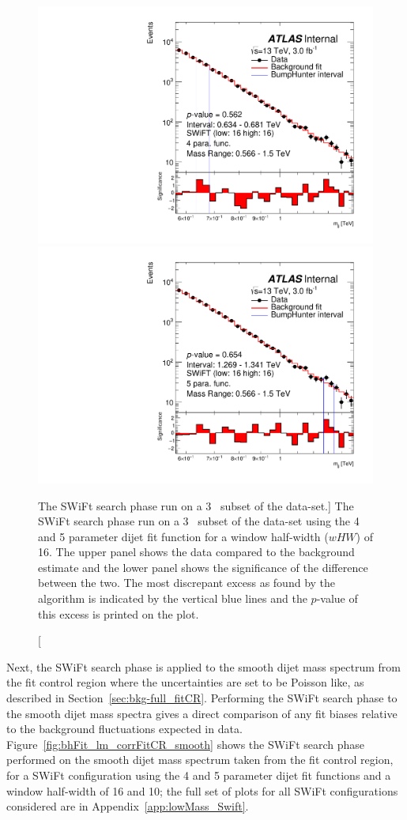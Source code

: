 \begin{figure}[!htb]
  \vspace{-1.5mm}
\captionsetup[subfigure]{aboveskip=0pt,justification=centering}
\centering
{} {
  \includegraphics[width=0.42\linewidth, angle=0]{figs/Dibjet/LowMass/FitStudy_min566/bhFit_subset_4para_low16_high16.pdf}
}
 {
  \includegraphics[width=0.42\linewidth, angle=0]{figs/Dibjet/LowMass/FitStudy_min566/bhFit_subset_5para_low16_high16.pdf}
}
\caption
    [The SWiFt search phase run on a 3~\ifb{} subset of the \lm{} data-set.]
    {\label{fig:bhFit_lm_subset}
      The SWiFt search phase run on a 3~\ifb{} subset of the \lm{} data-set using the 4 and 5 parameter dijet fit function for a window half-width ($wHW$) of 16.
      The upper panel shows the data compared to the background estimate and the lower panel shows the significance of the difference between the two.
      The most discrepant excess as found by the \bh{} algorithm is indicated by the vertical blue lines and the \mbox{$p$-value} of this excess is printed on the plot. }
\end{figure}

Next, the SWiFt search phase is applied to the smooth dijet mass spectrum from the fit control region
where the uncertainties are set to be Poisson like,
as described in Section~\ref{sec:bkg-full_fitCR}.
Performing the SWiFt search phase to the smooth dijet mass spectra gives a direct comparison
of any fit biases relative to the background fluctuations expected in data.
Figure~\ref{fig:bhFit_lm_corrFitCR_smooth} shows the SWiFt search phase
performed on the smooth dijet mass spectrum taken from the fit control region,
for a SWiFt configuration using the 4 and 5 parameter dijet fit functions and a window half-width of 16 and 10;
the full set of plots for all SWiFt configurations considered are in Appendix~\ref{app:lowMass_Swift}.

